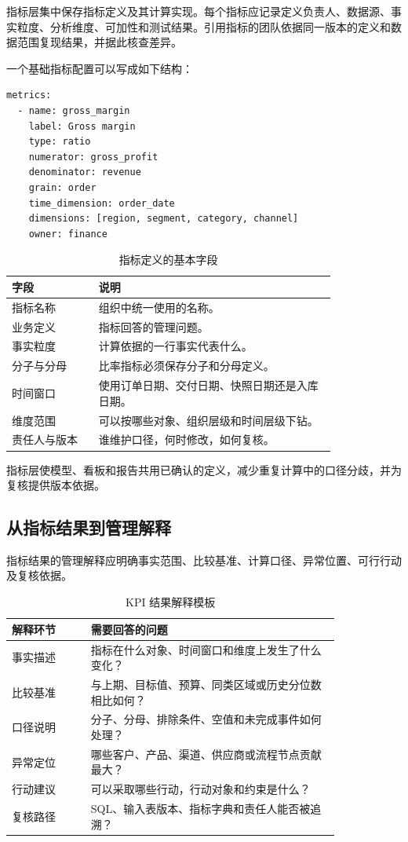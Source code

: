 指标层集中保存指标定义及其计算实现。每个指标应记录定义负责人、数据源、事实粒度、分析维度、可加性和测试结果。引用指标的团队依据同一版本的定义和数据范围复现结果，并据此核查差异。

一个基础指标配置可以写成如下结构：

\begin{lstlisting}[style=bookcode,language={},caption={指标配置示例}]
metrics:
  - name: gross_margin
    label: Gross margin
    type: ratio
    numerator: gross_profit
    denominator: revenue
    grain: order
    time_dimension: order_date
    dimensions: [region, segment, category, channel]
    owner: finance
\end{lstlisting}

\begin{table}[htbp]
\centering
\caption{指标定义的基本字段}
\begin{tabular}{P{0.22\linewidth}P{0.60\linewidth}}
\toprule
{}
字段 & 说明\\
\midrule
指标名称 & 组织中统一使用的名称。\\
业务定义 & 指标回答的管理问题。\\
事实粒度 & 计算依据的一行事实代表什么。\\
分子与分母 & 比率指标必须保存分子和分母定义。\\
时间窗口 & 使用订单日期、交付日期、快照日期还是入库日期。\\
维度范围 & 可以按哪些对象、组织层级和时间层级下钻。\\
责任人与版本 & 谁维护口径，何时修改，如何复核。\\
\bottomrule
\end{tabular}
\end{table}

指标层使模型、看板和报告共用已确认的定义，减少重复计算中的口径分歧，并为复核提供版本依据。

\subsection{从指标结果到管理解释}

指标结果的管理解释应明确事实范围、比较基准、计算口径、异常位置、可行行动及复核依据。

\begin{table}[htbp]
\centering
\caption{KPI 结果解释模板}
\begin{tabular}{P{0.20\linewidth}P{0.63\linewidth}}
\toprule
{}
解释环节 & 需要回答的问题\\
\midrule
事实描述 & 指标在什么对象、时间窗口和维度上发生了什么变化？\\
比较基准 & 与上期、目标值、预算、同类区域或历史分位数相比如何？\\
口径说明 & 分子、分母、排除条件、空值和未完成事件如何处理？\\
异常定位 & 哪些客户、产品、渠道、供应商或流程节点贡献最大？\\
行动建议 & 可以采取哪些行动，行动对象和约束是什么？\\
复核路径 & SQL、输入表版本、指标字典和责任人能否被追溯？\\
\bottomrule
\end{tabular}
\end{table}

